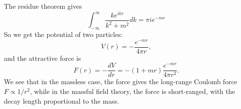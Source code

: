 The residue theorem gives
\begin{equation}
	\int_{-\infty}^\infty \frac{k e^{ikr}}{k^2 +m^2} dk = \pi ie^{-mr}
\end{equation}
So we get the potential of two particles:
\begin{equation}\label{eq:field-to-force}
	V(r) = -\frac{e^{-mr}}{4\pi r},
\end{equation}
and the attractive force is
\begin{equation}
	F(r) = -\frac{dV}{dr} = -(1+mr)\frac{e^{-mr}}{4\pi r^2}.
\end{equation}
We see that in the massless case, the force gives the long-range Coulomb force $F \propto 1/r^2$, while in the massful field theory, the force is short-ranged, with the decay length proportional to the mass.



